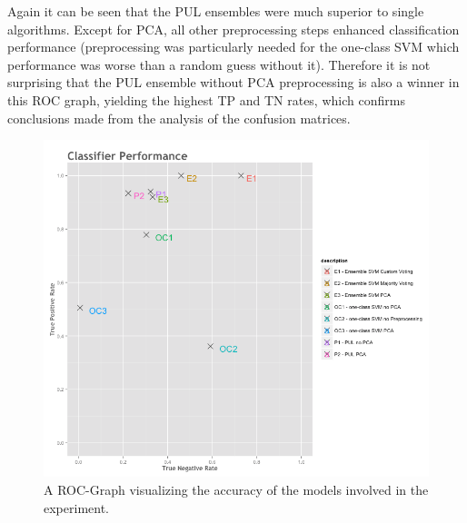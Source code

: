Again it can be seen that the PUL ensembles were much superior to single algorithms. Except for PCA, all other preprocessing steps enhanced classification performance (preprocessing was particularly needed for the one-class SVM which performance was worse than a random guess without it). Therefore it is not surprising that the PUL ensemble without PCA preprocessing is also a winner in this ROC graph, yielding the highest TP and TN rates, which confirms conclusions made from the analysis of the confusion matrices.

\begin{figure}[ht!]
    \centering 
    \includegraphics[scale=0.5]{Graphics/classifier-performance.png}
    \caption{A ROC-Graph visualizing the accuracy of the models involved in the experiment.}
    \label{fig:classifier-comparison}
\end{figure}







 
